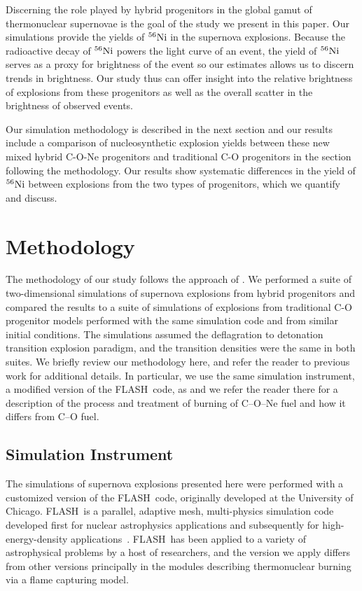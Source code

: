 \documentclass[preprint2]{aastex63}
\newcommand{\Ni}[1]{\ensuremath{{}^{#1}{\rm Ni}}}
\newcommand{\code}[1]{\textsc{#1}}
\newcommand{\FLASH}{\code{FLASH}}
\begin{document}
{\color{blue} 
Discerning the role played by hybrid progenitors in the global gamut of
thermonuclear supernovae is the goal of the study we present in this paper. Our simulations
provide the yields of \Ni{56} in the supernova explosions. Because
the radioactive decay of \Ni{56} powers the light curve of an event, 
the yield of \Ni{56} serves as a proxy for brightness of the event so
our estimates allows us to discern trends in brightness. Our study thus 
can offer insight into the relative brightness of explosions from these
progenitors as well as the overall scatter in the brightness
of observed events.

Our simulation methodology is described in the next section and
our results include a comparison of nucleosynthetic explosion yields between these
new mixed hybrid C-O-Ne progenitors and traditional C-O progenitors
in the section following the methodology. Our results show systematic
differences in the yield of \Ni{56} between explosions from the two
types of progenitors, which we quantify and discuss.
}

\section{Methodology}
\label{sec:method}

The methodology of our study follows the approach of \citet{willcoxetal2016}.
We performed a suite of two-dimensional simulations of supernova explosions
from hybrid progenitors and compared the results to a suite of simulations
of explosions from traditional C-O progenitor models performed with the
same simulation code and from similar initial conditions. The simulations assumed
the deflagration to detonation transition explosion paradigm, and the
transition densities were the same in both suites. We briefly review our methodology
here, and refer the reader to previous work for additional details.
In particular, we use the same simulation instrument, a modified version
of the \FLASH\ code, as \citet{willcoxetal2016} and we refer the reader there
for a description of the process and treatment of burning of C--O--Ne fuel and how it differs from C--O fuel.

\subsection{Simulation Instrument}

The simulations of supernova explosions presented here were performed
with a customized version of the \FLASH\ code, originally developed
at the University of Chicago.
\FLASH\ is a parallel, adaptive mesh, multi-physics simulation code
developed first for nuclear astrophysics applications and subsequently
for high-energy-density applications~\citep{Fryxetal00,calder.curtis.ea:high-performance,
calder.fryxell.ea:on,flash_pragmatic,flash_evolution}.
\FLASH\ has been applied to a variety of astrophysical problems by a host
of researchers, and the version we apply differs from other versions
principally in the modules describing thermonuclear burning via a
flame capturing model.
\end{document}
